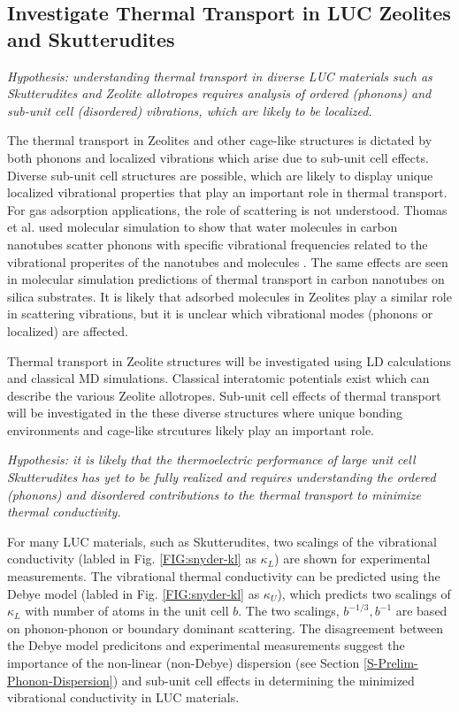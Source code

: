 \documentclass[letterpaper,12pt]{article}
\begin{document}
\subsection{\label{S-Research-Objectives-2}Investigate Thermal Transport in LUC Zeolites and Skutterudites}

\textit{Hypothesis: understanding thermal transport in diverse LUC materials such as Skutterudites and Zeolite allotropes requires analysis of ordered (phonons) and sub-unit cell (disordered) vibrations, which are likely to be localized.}

The thermal transport in Zeolites and other cage-like structures is dictated by both phonons\cite{mcgaughey2004b} and localized vibrations which arise due to sub-unit cell effects.\cite{O'Keeffe20003,doi:10.1021/ar000034b} Diverse sub-unit cell structures are possible, which are likely to display unique localized vibrational properties that play an important role in thermal transport. For gas adsorption applications, the role of scattering is not understood. Thomas et al. used molecular simulation to show that water molecules in carbon nanotubes scatter phonons with specific vibrational frequencies related to the vibrational properites of the nanotubes and molecules \cite{thomas2010c}. The same effects are seen in molecular simulation predictions of thermal transport in carbon nanotubes on silica substrates.\cite{shiomi2011b} It is likely that adsorbed molecules in Zeolites play a similar role in scattering vibrations, but it is unclear which vibrational modes (phonons or localized) are affected.\cite{Miyamoto1994117}

Thermal transport in Zeolite structures will be investigated using LD calculations and classical MD simulations.  Classical interatomic potentials exist which can describe the various Zeolite allotropes.\cite{mcgaughey2004b} Sub-unit cell effects of thermal transport will be investigated in the these diverse structures where unique bonding environments and cage-like strcutures likely play an important role.


\textit{Hypothesis: it is likely that the thermoelectric performance of large unit cell Skutterudites has yet to be fully realized and requires understanding the ordered (phonons) and disordered contributions to the thermal transport to minimize thermal conductivity.}

For many LUC materials, such as Skutterudites, two scalings of the vibrational conductivity
(labled in Fig. \ref{FIG:snyder-kl}  as $\kappa_{L}$) are shown for experimental measurements.\cite{Toberer2011} The vibrational thermal conductivity can be predicted using the Debye model (labled in Fig. \ref{FIG:snyder-kl}  as $\kappa_{U}$), which predicts two
scalings of $\kappa_{L}$ with number of atoms in the unit cell $b$. The two scalings, $b^{-1/3},b^{-1}$ are based on phonon-phonon or boundary dominant scattering.\cite{Toberer2011} The disagreement between the Debye model predicitons and experimental measurements suggest the importance of the non-linear (non-Debye) dispersion (see Section \ref{S-Prelim-Phonon-Dispersion}) and sub-unit cell effects in determining the minimized vibrational conductivity in LUC materials.
\end{document}

